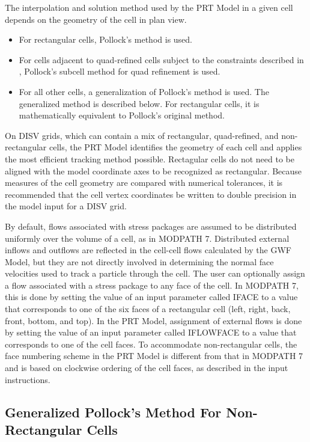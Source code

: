 The interpolation and solution method used by the PRT Model in a given cell depends on the geometry of the cell in plan view.

\begin{itemize}
\item For rectangular cells, Pollock's method \citep{pollock2016modpath7} is used.
\item For cells adjacent to quad-refined cells subject to the constraints described in \citep{pollock2016modpath7}, Pollock's subcell method for quad refinement \citep{pollock2015} is used.
\item For all other \mf cells, a generalization of Pollock's method is used. The generalized method is described below. For rectangular cells, it is mathematically equivalent to Pollock's original method.
\end{itemize}

\noindent On DISV grids, which can contain a mix of rectangular, quad-refined, and non-rectangular cells, the PRT Model identifies the geometry of each cell and applies the most efficient tracking method possible. Rectagular cells do not need to be aligned with the model coordinate axes to be recognized as rectangular. Because measures of the cell geometry are compared with numerical tolerances, it is recommended that the cell vertex coordinates be written to double precision in the model input for a DISV grid.

By default, flows associated with stress packages are assumed to be distributed uniformly over the volume of a cell, as in MODPATH 7. Distributed external inflows and outflows are reflected in the cell-cell flows calculated by the GWF Model, but they are not directly involved in determining the normal face velocities used to track a particle through the cell. The user can optionally assign a flow associated with a stress package to any face of the cell. In MODPATH 7, this is done by setting the value of an input parameter called IFACE to a value that corresponds to one of the six faces of a rectangular cell (left, right, back, front, bottom, and top). In the PRT Model, assignment of external flows is done by setting the value of an input parameter called IFLOWFACE to a value that corresponds to one of the cell faces. To accommodate non-rectangular cells, the face numbering scheme in the PRT Model is different from that in MODPATH 7 and is based on clockwise ordering of the cell faces, as described in the \mf input instructions.

\subsection{Generalized Pollock's Method For Non-Rectangular Cells} \label{sec:genpollockmethod}

